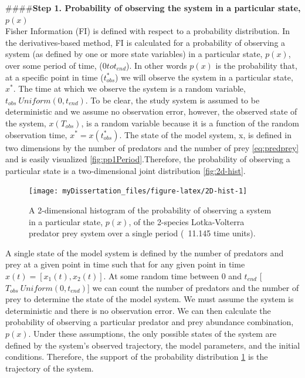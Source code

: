 \documentclass[12pt,twoside]{reedthesis}
\begin{document}
\#\#\#\#\textbf{Step 1. Probability of observing the system in a particular state, \(p(x)\)}\\
Fisher Information (FI) is defined with respect to a probability distribution. In the derivatives-based method, FI is calculated for a probability of observing a system (as defined by one or more state variables) in a particular state, \(p(x)\), over some period of time, (\(0 to t_{end}\)). In other words \(p(x)\) is the probability that, at a specific point in time (\(t_{obs}^*\)) we will observe the system in a particular state, \(x^*\). The time at which we observe the system is a random variable, \(t_{obs} ~ Uniform(0,t_{end})\). To be clear, the study system is assumed to be deterministic and we assume no observation error, however, the observed state of the system, \(x(T_{obs})\), is a random variable because it is a function of the random observation time, \(x^*= x(t_{obs}^*)\). The state of the model system, x, is defined in two dimensions by the number of predators and the number of prey \eqref{eq:predprey} and is easily visualized \ref{fig:pp1Period}.Therefore, the probability of observing a particular state is a two-dimensional joint distribution \ref{fig:2d-hist}.
\begin{figure}
\texttt{[image: myDissertation\_files/figure-latex/2D-hist-1]} \caption{A 2-dimensional histogram of the probability of observing a system in a particular state, $p(x)$, of the 2-species Lotka-Volterra predator prey system over a single period (~11.145 time units).}\label{fig:2D-hist}
\end{figure}
A single state of the model system is defined by the number of predators and prey at a given point in time such that for any given point in time \(x(t)=[x_1 (t),x_2 (t)]\). At some random time between 0 and \(t_{end}\) {[}\(T_{obs} ~ Uniform(0,t_{end})\){]} we can count the number of predators and the number of prey to determine the state of the model system. We must assume the system is deterministic and there is no observation error. We can then calculate the probability of observing a particular predator and prey abundance combination, \(p(x)\). Under these assumptions, the only possible states of the system are defined by the system's observed trajectory, the model parameters, and the initial conditions. Therefore, the support of the probability distribution \ref{fig:2D-hist} is the trajectory of the system.
\end{document}
